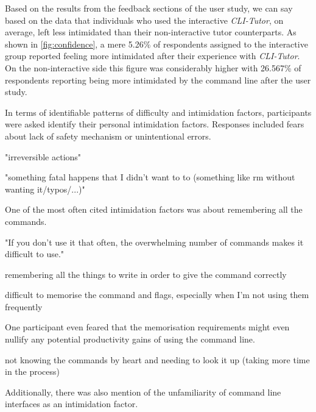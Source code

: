 Based on the results from the feedback sections of the user study, we can say
based on the data that individuals who used the interactive \textit{CLI-Tutor},
on average, left less intimidated than their non-interactive tutor
counterparts. As shown in \autoref{fig:confidence}, a mere 5.26\% of
respondents assigned to the interactive group reported feeling more intimidated
after their experience with \textit{CLI-Tutor}. On the non-interactive side
this figure was considerably higher with 26.567\% of respondents reporting
being more intimidated by the command line after the user study.

In terms of identifiable patterns of difficulty and intimidation factors,
participants were asked identify their personal intimidation factors. Responses
included fears about lack of safety mechanism or unintentional errors.

\begin{quotes}
    "irreversible actions"
\end{quotes}

\begin{quotes}
"something fatal happens that I didn't want to to (something like rm without wanting it/typos/...)"
\end{quotes}

One of the most often cited intimidation factors was about remembering all the commands. 
\begin{quotes}
"If you don't use it that often, the overwhelming number of commands makes it difficult to use."
\end{quotes}

\begin{quotes}
remembering all the things to write in order to give the command correctly
\end{quotes}

\begin{quotes}
difficult to memorise the command and flags, especially when I'm not using them frequently
\end{quotes}

One participant even feared that the memorisation requirements might even
nullify any potential productivity gains of using the command line.

\begin{quotes}
not knowing the commands by heart and needing to look it up (taking more time in the
process)
\end{quotes}

Additionally, there was also mention of the unfamiliarity of command line
interfaces as an intimidation factor.

